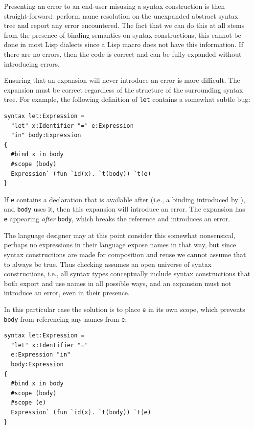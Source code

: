 \documentclass{kththesis}
\begin{document}
Presenting an error to an end-user misusing a syntax construction is then straight-forward: perform name resolution on the unexpanded abstract syntax tree and report any error encountered. The fact that we can do this at all stems from the presence of binding semantics on syntax constructions, this cannot be done in most Lisp dialects since a Lisp macro does not have this information. If there are no errors, then the code is correct and can be fully expanded without introducing errors.

Ensuring that an expansion will never introduce an error is more difficult. The expansion must be correct regardless of the structure of the surrounding syntax tree. For example, the following definition of \texttt{let} contains a somewhat subtle bug:

\begin{verbatim}
syntax let:Expression =
  "let" x:Identifier "=" e:Expression
  "in" body:Expression
{
  #bind x in body
  #scope (body)
  Expression` (fun `id(x). `t(body)) `t(e)
}
\end{verbatim}

If \texttt{e} contains a declaration that is available after  (i.e., a binding introduced by ), and \texttt{body} uses it, then this expansion will introduce an error. The expansion has \texttt{e} appearing \emph{after} \texttt{body}, which breaks the reference and introduces an error.

The language designer may at this point consider this somewhat nonsensical, perhaps no expressions in their language expose names in that way, but since syntax constructions are made for composition and reuse we cannot assume that to always be true. Thus checking assumes an open universe of syntax constructions, i.e., all syntax types conceptually include syntax constructions that both export and use names in all possible ways, and an expansion must not introduce an error, even in their presence.

In this particular case the solution is to place \texttt{e} in its own scope, which prevents \texttt{body} from referencing any names from \texttt{e}:

\begin{verbatim}
syntax let:Expression =
  "let" x:Identifier "="
  e:Expression "in"
  body:Expression
{
  #bind x in body
  #scope (body)
  #scope (e)
  Expression` (fun `id(x). `t(body)) `t(e)
}
\end{verbatim}
\end{document}
